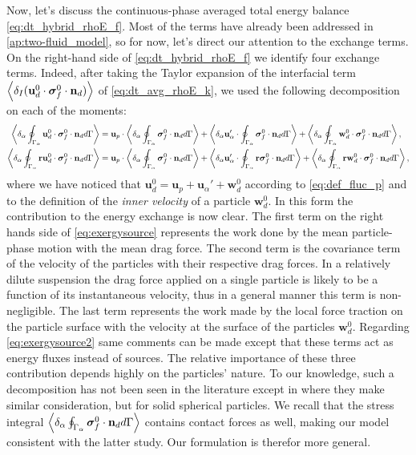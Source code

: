 Now, let's discuss the continuous-phase averaged total energy balance \eqref{eq:dt_hybrid_rhoE_f}. 
Most of the terms have already been addressed in \ref{ap:two-fluid_model}, so for now, let's direct our attention to the exchange terms. 
On the right-hand side of \ref{eq:dt_hybrid_rhoE_f} we identify four exchange terms.
Indeed, after taking the Taylor expansion of the interfacial term $\left<\delta_I (\textbf{u}^0_d \cdot \bm{\sigma}_f^0 \cdot \textbf{n}_d)\right>$ of \ref{eq:dt_avg_rhoE_k}, we used the following decomposition on each of the moments:
\begin{align}
    \label{eq:exergysource}
    \left<\delta_\alpha  \oint_{\Gamma_\alpha} \textbf{u}^0_d \cdot \bm{\sigma}_f^0 \cdot \textbf{n}_d d\Gamma\right>
    &= 
    \textbf{u}_p \cdot \left<\delta_\alpha \oint_{\Gamma_\alpha} {\bm{\sigma}_f^0 \cdot \textbf{n}_d} d\Gamma\right>
    + \left<\delta_\alpha  \textbf{u}_\alpha' \cdot \oint_{\Gamma_\alpha}   \bm{\sigma}_f^0 \cdot \textbf{n}_d d\Gamma\right>
    + \left<\delta_\alpha  \oint_{\Gamma_\alpha} \textbf{w}_d^0 \cdot \bm{\sigma}_f^0 \cdot \textbf{n}_d d\Gamma\right>,\\
    \label{eq:exergysource2}
    \left<\delta_\alpha  \oint_{\Gamma_\alpha} \textbf{r}\textbf{u}^0_d \cdot \bm{\sigma}_f^0 \cdot \textbf{n}_d d\Gamma\right>
   &= 
    \textbf{u}_p \cdot \left<\delta_\alpha \oint_{\Gamma_\alpha} {\bm{\sigma}_f^0 \cdot \textbf{n}_d} d\Gamma\right>
    + \left<\delta_\alpha  \textbf{u}_\alpha' \cdot \oint_{\Gamma_\alpha} \textbf{r}  \bm{\sigma}_f^0 \cdot \textbf{n}_d d\Gamma\right>
    + \left<\delta_\alpha  \oint_{\Gamma_\alpha} \textbf{r}\textbf{w}_d^0 \cdot \bm{\sigma}_f^0 \cdot \textbf{n}_d d\Gamma\right>,
\end{align}
where we have noticed that $\textbf{u}_d^0 = \textbf{u}_p + \textbf{u}_\alpha' +\textbf{w}_d^0$ according to \ref{eq:def_fluc_p} and to the definition of the \textit{inner velocity} of a particle $\textbf{w}_d^0$. 
In this form the contribution to the energy exchange is now clear. 
The first term on the right hands side of \ref{eq:exergysource} represents the work done by the mean particle-phase motion with the mean drag force.
The second term is the covariance term of the velocity of the particles with their respective drag forces.
In a relatively dilute suspension the drag force applied on a single particle is likely to be a function of its instantaneous velocity, thus in a general manner this term is non-negligible. 
The last term represents the work made by the local force traction on the particle surface with the velocity at the surface of the particles $\textbf{w}_d^0$.
Regarding \eqref{eq:exergysource2} same comments can be made except that these terms act as energy fluxes instead of sources. 
The relative importance of these three contribution depends highly on the particles' nature. 
To our knowledge, such a decomposition has not been seen in the literature except in \citep[Chapter 2]{scorsim2021particle} where they make similar consideration, but for solid spherical particles.
We recall that the stress integral $\left<\delta_\alpha \oint_{\Gamma_\alpha} \bm{\sigma}_f^0 \cdot \textbf{n}_d d\Gamma\right>$ contains contact forces as well, making our model consistent with the latter study. 
Our formulation is therefor more general. 




